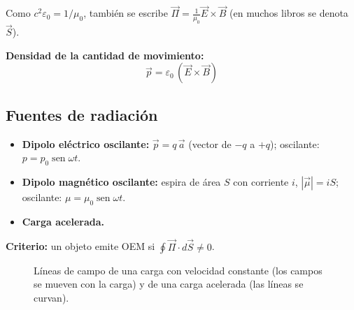 \documentclass[11pt,a4paper]{article}
\DeclareMathOperator{\sen}{sen}
\begin{document}
\begin{obs}
Como $c^2\varepsilon_0=1/\mu_0$, también se escribe $\vec\Pi=\frac{1}{\mu_0}\vec E\times\vec B$ (en muchos libros se denota $\vec S$).
\end{obs}

\textbf{Densidad de la cantidad de movimiento:}
\[
\vec p=\varepsilon_0\,(\vec E\times\vec B)
\]

\subsection{Fuentes de radiación}
\begin{itemize}
  \item \textbf{Dipolo eléctrico oscilante:} $\vec p=q\,\vec a$ (vector de $-q$ a $+q$); oscilante: $p=p_0\sen\omega t$.
  \item \textbf{Dipolo magnético oscilante:} espira de área $S$ con corriente $i$, $|\vec\mu|=iS$; oscilante: $\mu=\mu_0\sen\omega t$.
  \item \textbf{Carga acelerada.}
\end{itemize}

\textbf{Criterio:} un objeto emite OEM si $\displaystyle\oint\vec\Pi\cdot d\vec S\neq0$.

\begin{figure}[H]
\centering
{}
\caption{Líneas de campo de una carga con velocidad constante (los campos se mueven con la carga) y de una carga acelerada (las líneas se curvan).}
\end{figure}
\end{document}
